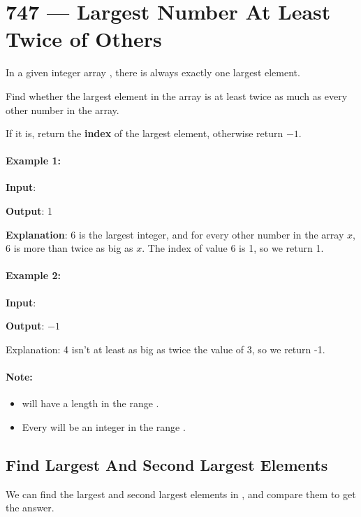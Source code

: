 \section{747 --- Largest Number At Least Twice of Others}
In a given integer array , there is always exactly one largest element.

Find whether the largest element in the array is at least twice as much as every other number in the array.

If it is, return the \textbf{index} of the largest element, otherwise return $-1$.

\paragraph{Example 1:}

\begin{flushleft}
\textbf{Input}: 

\textbf{Output}: 1

\textbf{Explanation}: 6 is the largest integer, and for every other number in the array $x$,
6 is more than twice as big as $x$.  The index of value 6 is 1, so we return 1.

\end{flushleft}
 

\paragraph{Example 2:}

\begin{flushleft}
\textbf{Input}: 

\textbf{Output}: $-1$

Explanation: 4 isn't at least as big as twice the value of 3, so we return -1.

\end{flushleft}
 

\paragraph{Note:}

\begin{itemize}
\item {} will have a length in the range \fcj{[1, 50]}.
\item Every  will be an integer in the range \fcj{[0, 99]}.
\end{itemize}

\subsection{Find Largest And Second Largest Elements}
We can find the largest and second largest elements in , and compare them to get the answer.

